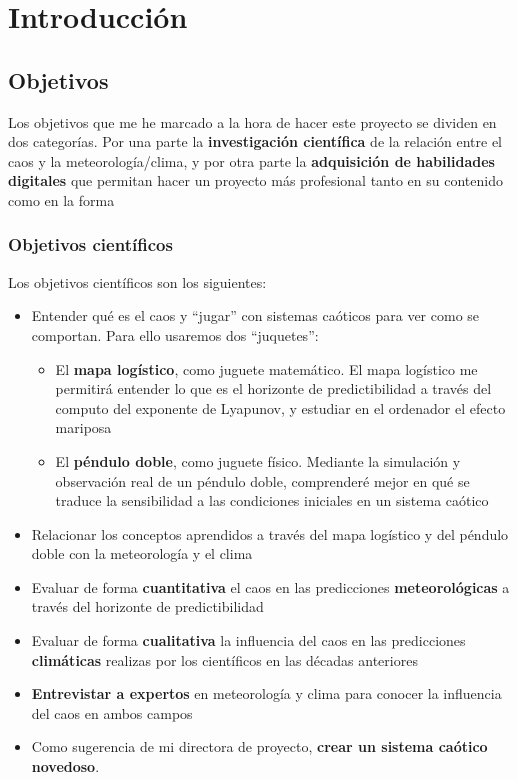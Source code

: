 \documentclass[
  11pt,
  a4paper,
  DIV=11,
  numbers=noendperiod]{scrreprt}
\providecommand{\tightlist}{%
  \setlength{\itemsep}{0pt}\setlength{\parskip}{0pt}}
\begin{document}
\part{Introducción}

\chapter{Objetivos}\label{objetivos}

Los objetivos que me he marcado a la hora de hacer este proyecto se
dividen en dos categorías. Por una parte la \textbf{investigación
científica} de la relación entre el caos y la meteorología/clima, y por
otra parte la \textbf{adquisición de habilidades digitales} que permitan
hacer un proyecto más profesional tanto en su contenido como en la forma

\section{Objetivos científicos}\label{objetivos-cientuxedficos}

Los objetivos científicos son los siguientes:

\begin{itemize}
\item
  Entender qué es el caos y ``jugar'' con sistemas caóticos para ver
  como se comportan. Para ello usaremos dos ``juquetes'':

  \begin{itemize}
  \tightlist
  \item
    El \textbf{mapa logístico}, como juguete matemático. El mapa
    logístico me permitirá entender lo que es el horizonte de
    predictibilidad a través del computo del exponente de Lyapunov, y
    estudiar en el ordenador el efecto mariposa
  \item
    El \textbf{péndulo doble}, como juguete físico. Mediante la
    simulación y observación real de un péndulo doble, comprenderé mejor
    en qué se traduce la sensibilidad a las condiciones iniciales en un
    sistema caótico
  \end{itemize}
\item
  Relacionar los conceptos aprendidos a través del mapa logístico y del
  péndulo doble con la meteorología y el clima
\item
  Evaluar de forma \textbf{cuantitativa} el caos en las predicciones
  \textbf{meteorológicas} a través del horizonte de predictibilidad
\item
  Evaluar de forma \textbf{cualitativa} la influencia del caos en las
  predicciones \textbf{climáticas} realizas por los científicos en las
  décadas anteriores
\item
  \textbf{Entrevistar a expertos} en meteorología y clima para conocer
  la influencia del caos en ambos campos
\item
  Como sugerencia de mi directora de proyecto, \textbf{crear un sistema
  caótico novedoso}.
\end{itemize}
\end{document}
